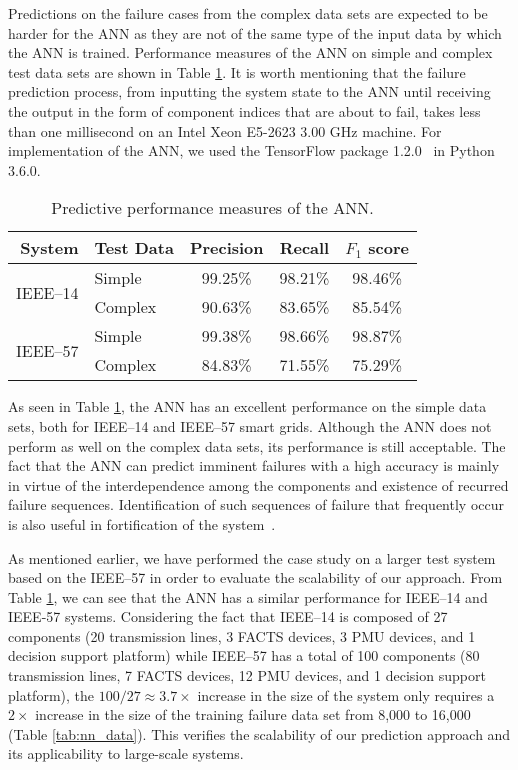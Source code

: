 \documentclass[12pt]{elsarticle}
\begin{document}
Predictions on the failure cases from the complex data sets are expected to be harder for the ANN as they are not of the same type of the input data by which the ANN is trained. Performance measures of the ANN on simple and complex test data sets are shown in Table \ref{tab:nn_perf}. It is worth mentioning that the failure prediction process, from inputting the system state to the ANN until receiving the output in the form of component indices that are about to fail, takes less than one millisecond on an Intel Xeon E5-2623 3.00 GHz machine. For implementation of the ANN, we used the TensorFlow package 1.2.0~\cite{AbA15} in Python 3.6.0.

\begin{table}
\caption{Predictive performance measures of the ANN.}
\label{tab:nn_perf}
\centering
\renewcommand{\arraystretch}{1.1}
\begin{tabular}{rl|ccc}
System                    & Test Data & Precision & Recall  & $F_1$ score \\ \hline %
\multirow{2}{*}{IEEE--14} & Simple    & 99.25\%   & 98.21\% & 98.46\%     \\        %
                          & Complex   & 90.63\%   & 83.65\% & 85.54\%     \\ \hline %
\multirow{2}{*}{IEEE--57} & Simple    & 99.38\%   & 98.66\% & 98.87\%     \\        %
                          & Complex   & 84.83\%   & 71.55\% & 75.29\%               %
\end{tabular}
\end{table}

As seen in Table \ref{tab:nn_perf}, the ANN has an excellent performance on the simple data sets, both for IEEE--14 and IEEE--57 smart grids. Although the ANN does not perform as well on the complex data sets, its performance is still acceptable. The fact that the ANN can predict imminent failures with a high accuracy is mainly in virtue of the interdependence among the components and existence of recurred failure sequences. Identification of such sequences of failure that frequently occur is also useful in fortification of the system~\cite{WoM20}.

As mentioned earlier, we have performed the case study on a larger test system based on the IEEE--57 in order to evaluate the scalability of our approach. From Table \ref{tab:nn_perf}, we can see that the ANN has a similar performance for IEEE--14 and IEEE-57 systems. Considering the fact that IEEE--14 is composed of 27 components (20 transmission lines, 3 FACTS devices, 3 PMU devices, and 1 decision support platform) while IEEE--57 has a total of 100 components (80 transmission lines, 7 FACTS devices, 12 PMU devices, and 1 decision support platform), the $100/27 \approx 3.7 \times$ increase in the size of the system only requires a $2 \times$ increase in the size of the training failure data set from 8,000 to 16,000 (Table \ref{tab:nn_data}). This verifies the scalability of our prediction approach and its applicability to large-scale systems.
\end{document}
